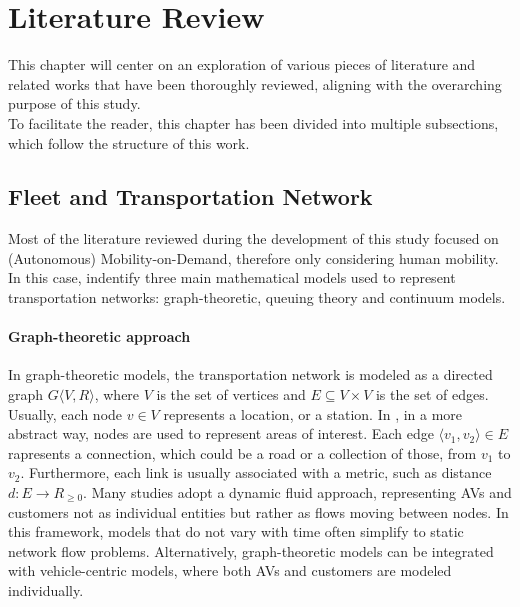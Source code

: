 \chapter{Literature Review}\label{ch:related_work}
This chapter will center on an exploration of various pieces of literature and related works that have been thoroughly reviewed, aligning with the overarching purpose of this study.\\
To facilitate the reader, this chapter has been divided into multiple subsections, which follow the structure of this work. 

\section{Fleet and Transportation Network}
Most of the literature reviewed during the development of this study focused on (Autonomous) Mobility-on-Demand, therefore only considering human mobility.%
In this case,  indentify three main mathematical models used to represent transportation networks: graph-theoretic, queuing theory and continuum models. \\
\subsubsection*{Graph-theoretic approach}
In graph-theoretic models, the transportation network is modeled as a directed graph $G  \langle V, R\rangle$, where $V$ is the set of vertices and $E\subseteq  V \times V$ is the set of edges. Usually, each node $v \in V$ represents a location, or a station. In \cite{project_thesis}, in a more abstract way, nodes are used to represent areas of interest. Each edge $\langle v_1, v_2\rangle \in E$ rapresents a connection, which could be a road or a collection of those, from $v_1$ to $v_2$. Furthermore, each link is usually associated with a metric, such as distance $d : E \rightarrow R_{\ge0}$.  Many studies adopt a dynamic fluid approach, representing AVs and customers not as individual entities but rather as flows moving between nodes. In this framework, models that do not vary with time often simplify to static network flow problems. Alternatively, graph-theoretic models can be integrated with vehicle-centric models, where both AVs and customers are modeled individually.
